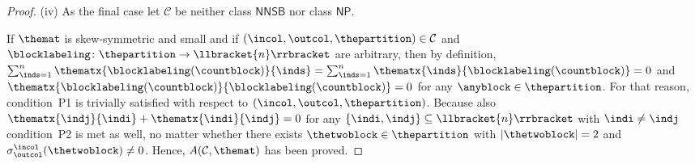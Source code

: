 \documentclass[10pt,a4paper]{amsart}
\numberwithin{equation}{section}
\newcommand{\dwi}[1]{\llbracket{#1}\rrbracket}
\newcommand{\xfromto}[3]{#1 \colon  #2 \to #3}
\newcommand{\csx}[3]{\sigma^{#1}_{#2}(#3)}
\newcommand{\thedim}{n}
\newcommand{\thecat}{\mathcal{C}}
\newcommand{\thepredicatex}[2]{A(#1,#2)}
\newcommand{\conditionone}{P1}
\newcommand{\conditiontwo}{P2}
\newcommand{\onlyneutralnonsingletonblocks}{\mathsf{NNSB}}
\newcommand{\onlyneutralpartitions}{\mathsf{NP}}
\begin{document}
{\begin{proof}
(iv)
 As the final case let $\thecat$ be neither class $\onlyneutralnonsingletonblocks$ nor class $\onlyneutralpartitions$.

  If $\themat$ is skew-symmetric and small and if $(\incol,\outcol,\thepartition)\in\thecat$ and $\xfromto{\blocklabeling}{\thepartition}{\dwi{\thedim}}$ are arbitrary, then by definition, $\sum_{\inds=1}^\thedim\thematx{\blocklabeling(\countblock)}{\inds}=\sum_{\inds=1}^\thedim\thematx{\inds}{\blocklabeling(\countblock)}=0$ and $\thematx{\blocklabeling(\countblock)}{\blocklabeling(\countblock)}=0$ for any  $\anyblock\in \thepartition$. For that reason, con\-di\-tion~\conditionone{} is trivially satisfied with respect to $(\incol,\outcol,\thepartition)$. Because also $\thematx{\indj}{\indi}+\thematx{\indi}{\indj}=0$ for any $\{\indi,\indj\}\subseteq\dwi{\thedim}$ with $\indi\neq \indj$ con\-di\-tion~\conditiontwo{} is met as well, no matter whether there exists  $\thetwoblock\in\thepartition$ with $|\thetwoblock|=2$ and $\csx{\incol}{\outcol}{\thetwoblock}\neq 0$. Hence, $\thepredicatex{\thecat}{\themat}$ has been proved.


\end{proof}}
\end{document}
